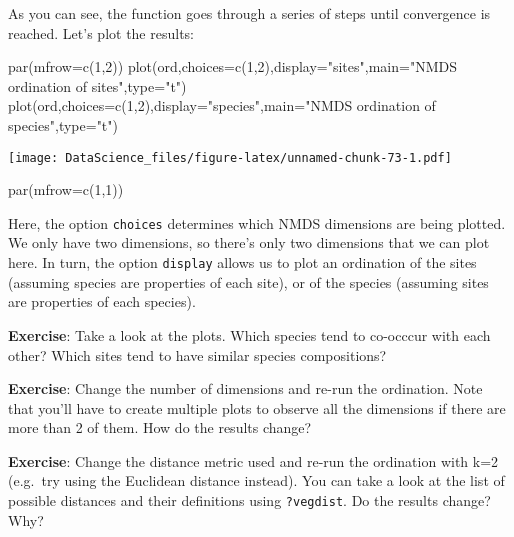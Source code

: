 \documentclass[
]{book}
\newenvironment{Shaded}{\begin{snugshade}}{\end{snugshade}}
\newcommand{\AttributeTok}[1]{\textcolor[rgb]{0.77,0.63,0.00}{#1}}
\newcommand{\DecValTok}[1]{\textcolor[rgb]{0.00,0.00,0.81}{#1}}
\newcommand{\FunctionTok}[1]{\textcolor[rgb]{0.00,0.00,0.00}{#1}}
\newcommand{\NormalTok}[1]{#1}
\newcommand{\StringTok}[1]{\textcolor[rgb]{0.31,0.60,0.02}{#1}}
\begin{document}
As you can see, the function goes through a series of steps until convergence is reached. Let's plot the results:

\begin{Shaded}
\begin{Highlighting}[]
\FunctionTok{par}\NormalTok{(}\AttributeTok{mfrow=}\FunctionTok{c}\NormalTok{(}\DecValTok{1}\NormalTok{,}\DecValTok{2}\NormalTok{))}
\FunctionTok{plot}\NormalTok{(ord,}\AttributeTok{choices=}\FunctionTok{c}\NormalTok{(}\DecValTok{1}\NormalTok{,}\DecValTok{2}\NormalTok{),}\AttributeTok{display=}\StringTok{"sites"}\NormalTok{,}\AttributeTok{main=}\StringTok{"NMDS ordination of sites"}\NormalTok{,}\AttributeTok{type=}\StringTok{"t"}\NormalTok{)}
\FunctionTok{plot}\NormalTok{(ord,}\AttributeTok{choices=}\FunctionTok{c}\NormalTok{(}\DecValTok{1}\NormalTok{,}\DecValTok{2}\NormalTok{),}\AttributeTok{display=}\StringTok{"species"}\NormalTok{,}\AttributeTok{main=}\StringTok{"NMDS ordination of species"}\NormalTok{,}\AttributeTok{type=}\StringTok{"t"}\NormalTok{)}
\end{Highlighting}
\end{Shaded}

\texttt{[image: DataScience\_files/figure-latex/unnamed-chunk-73-1.pdf]}

\begin{Shaded}
\begin{Highlighting}[]
\FunctionTok{par}\NormalTok{(}\AttributeTok{mfrow=}\FunctionTok{c}\NormalTok{(}\DecValTok{1}\NormalTok{,}\DecValTok{1}\NormalTok{))}
\end{Highlighting}
\end{Shaded}

Here, the option \texttt{choices} determines which NMDS dimensions are being plotted. We only have two dimensions, so there's only two dimensions that we can plot here. In turn, the option \texttt{display} allows us to plot an ordination of the sites (assuming species are properties of each site), or of the species (assuming sites are properties of each species).

\textbf{Exercise}: Take a look at the plots. Which species tend to co-occcur with each other? Which sites tend to have similar species compositions?

\textbf{Exercise}: Change the number of dimensions and re-run the ordination. Note that you'll have to create multiple plots to observe all the dimensions if there are more than 2 of them. How do the results change?

\textbf{Exercise}: Change the distance metric used and re-run the ordination with k=2 (e.g.~try using the Euclidean distance instead). You can take a look at the list of possible distances and their definitions using \texttt{?vegdist}. Do the results change? Why?
\end{document}
